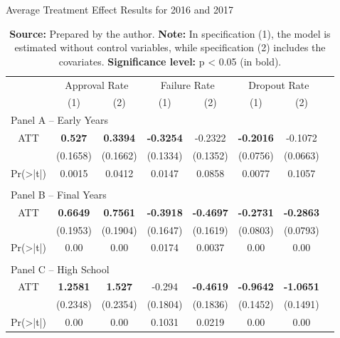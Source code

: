 \begin{table}[htbp]
    \centering
    \caption{Average Treatment Effect Results for 2016 and 2017}
        \label{tab:att_main_result}
        \begin{tabular}{cccccccc}
        \toprule
         & \multicolumn{2}{c}{Approval Rate} & \multicolumn{2}{c}{Failure Rate} & \multicolumn{2}{c}{Dropout Rate} \\
         & (1) & (2) & (1) & (2) & (1) & (2) \\
        \midrule
        \multicolumn{7}{l}{Panel A – Early Years} \\
        ATT       & \textbf{0.527} & \textbf{0.3394} & \textbf{-0.3254} & -0.2322 & \textbf{-0.2016} & -0.1072 \\
                  & (0.1658) & (0.1662) & (0.1334) & (0.1352) & (0.0756) & (0.0663) \\
        Pr(>|t|)  & 0.0015 & 0.0412 & 0.0147 & 0.0858 & 0.0077 & 0.1057 \\
        \\[-1.5ex]
        \multicolumn{7}{l}{Panel B – Final Years} \\
        ATT       & \textbf{0.6649} & \textbf{0.7561} & \textbf{-0.3918} & \textbf{-0.4697} & \textbf{-0.2731} & \textbf{-0.2863} \\
                  & (0.1953) & (0.1904) & (0.1647) & (0.1619) & (0.0803) & (0.0793) \\
        Pr(>|t|)  & 0.00 & 0.00 & 0.0174 & 0.0037 & 0.00 & 0.00 \\
        \\[-1.5ex]
        \multicolumn{7}{l}{Panel C – High School} \\
        
        ATT       & \textbf{1.2581} & \textbf{1.527} & -0.294 & \textbf{-0.4619} & \textbf{-0.9642} & \textbf{-1.0651} \\
                  & (0.2348) & (0.2354) & (0.1804) & (0.1836) & (0.1452) & (0.1491) \\
        Pr(>|t|)  & 0.00 & 0.00 & 0.1031 & 0.0219 & 0.00 & 0.00 \\
        
        \bottomrule
        \end{tabular}
\caption*{\footnotesize\textbf{Source:} Prepared by the author. \textbf{Note:} In specification (1), the model is estimated without control variables, while specification (2) includes the covariates. \textbf{Significance level:} p < 0.05 (in bold).}

\end{table}